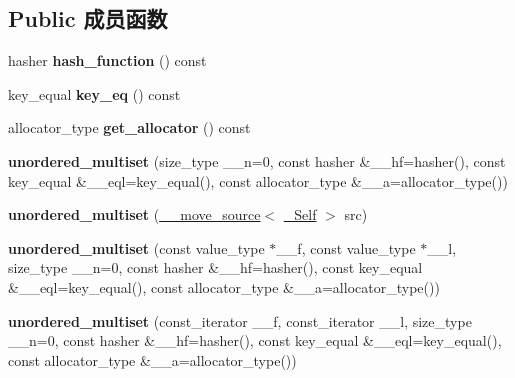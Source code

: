 \subsection*{Public 成员函数}
\begin{DoxyCompactItemize}
\item 
\mbox{\label{classunordered__multiset_abeceff0afe3c57c55079aafeb5ff3f87}} 
hasher {\bfseries hash\+\_\+function} () const
\item 
\mbox{\label{classunordered__multiset_a68af8ca6a4247bba8a984b8d2c54b12d}} 
key\+\_\+equal {\bfseries key\+\_\+eq} () const
\item 
\mbox{\label{classunordered__multiset_a2a624cf3e6008aa8697a11d2e52505cb}} 
allocator\+\_\+type {\bfseries get\+\_\+allocator} () const
\item 
\mbox{\label{classunordered__multiset_a10e51526d0390755faba00149755e374}} 
{\bfseries unordered\+\_\+multiset} (size\+\_\+type \+\_\+\+\_\+n=0, const hasher \&\+\_\+\+\_\+hf=hasher(), const key\+\_\+equal \&\+\_\+\+\_\+eql=key\+\_\+equal(), const allocator\+\_\+type \&\+\_\+\+\_\+a=allocator\+\_\+type())
\item 
\mbox{\label{classunordered__multiset_a9203a0676a23426068d5fb6a236779c0}} 
{\bfseries unordered\+\_\+multiset} (\hyperlink{class____move__source}{\+\_\+\+\_\+move\+\_\+source}$<$ \hyperlink{classunordered__multiset}{\+\_\+\+Self} $>$ src)
\item 
\mbox{\label{classunordered__multiset_a168aa26b1ed41aed712eecba8fcef644}} 
{\bfseries unordered\+\_\+multiset} (const value\+\_\+type $\ast$\+\_\+\+\_\+f, const value\+\_\+type $\ast$\+\_\+\+\_\+l, size\+\_\+type \+\_\+\+\_\+n=0, const hasher \&\+\_\+\+\_\+hf=hasher(), const key\+\_\+equal \&\+\_\+\+\_\+eql=key\+\_\+equal(), const allocator\+\_\+type \&\+\_\+\+\_\+a=allocator\+\_\+type())
\item 
\mbox{\label{classunordered__multiset_ad3dbfcc67498586a7790ac221e6f9b6e}} 
{\bfseries unordered\+\_\+multiset} (const\+\_\+iterator \+\_\+\+\_\+f, const\+\_\+iterator \+\_\+\+\_\+l, size\+\_\+type \+\_\+\+\_\+n=0, const hasher \&\+\_\+\+\_\+hf=hasher(), const key\+\_\+equal \&\+\_\+\+\_\+eql=key\+\_\+equal(), const allocator\+\_\+type \&\+\_\+\+\_\+a=allocator\+\_\+type())

\end{DoxyCompactItemize}
